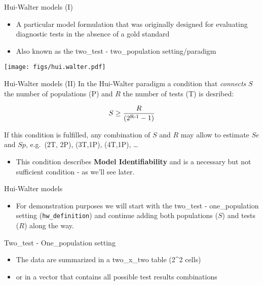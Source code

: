 \documentclass[
  ignorenonframetext,
]{beamer}
\providecommand{\tightlist}{%
  \setlength{\itemsep}{0pt}\setlength{\parskip}{0pt}}
\begin{document}
\begin{frame}
\begin{block}{Hui-Walter models (I)}
\protect\hypertarget{hui-walter-models-i}{}
\begin{itemize}
\item
  A particular model formulation that was originally designed for
  evaluating diagnostic tests in the absence of a gold standard
\item
  Also known as the two\_test - two\_population setting/paradigm
\end{itemize}

\texttt{[image: figs/hui.walter.pdf]}
\end{block}
\end{frame}

\begin{frame}
\begin{block}{Hui-Walter models (II)}
\protect\hypertarget{hui-walter-models-ii}{}
In the Hui-Walter paradigm a condition that \emph{connects} \(S\) the
number of populations (P) and \(R\) the number of tests (T) is desribed:

\[ S \geq \frac {R}{(2\textsuperscript{R-1} - 1)}\]

If this condition is fulfilled, any combination of \(S\) and \(R\) may
allow to estimate \(Se\) and \(Sp\), e.g.~(2T, 2P), (3T,1P), (4T,1P),
\ldots{}

\begin{itemize}
\tightlist
\item
  This condition describes \textbf{Model Identifiability} and is a
  necessary but not sufficient condition - as we'll see later.
\end{itemize}
\end{block}
\end{frame}

\begin{frame}[fragile]
\begin{block}{Hui-Walter models}
\protect\hypertarget{hui-walter-models-1}{}
\begin{itemize}
\tightlist
\item
  For demonstration purposes we will start with the two\_test -
  one\_population setting (\texttt{hw\_definition}) and continue adding
  both populations (\(S\)) and tests (\(R\)) along the way.
\end{itemize}

\begin{block}{Two\_test - One\_population setting}
\protect\hypertarget{two_test---one_population-setting}{}
\begin{itemize}
\item
  The data are summarized in a two\_x\_two table (2\^{}2 cells)
\item
  or in a vector that contains all possible test results combinations
\end{itemize}
\end{block}
\end{block}
\end{frame}
\end{document}
